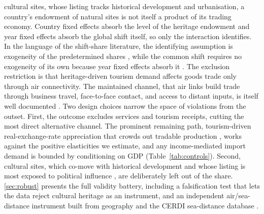 cultural sites, whose listing tracks historical development and urbanisation, a country's endowment of natural sites is not itself a product of its trading economy. Country fixed effects absorb the level of the heritage endowment and year fixed effects absorb the global shift itself, so only the interaction identifies. In the language of the shift-share literature, the identifying assumption is exogeneity of the predetermined shares \citep{GoldsmithPinkham_2020}, while the common shift requires no exogeneity of its own because year fixed effects absorb it \citep{Borusyak_2022}. The exclusion restriction is that heritage-driven tourism demand affects goods trade only through air connectivity. The maintained channel, that air links build trade through business travel, face-to-face contact, and access to distant inputs, is itself well documented \citep{Campante_2017,Feyrer_2019}. Two design choices narrow the space of violations from the outset. First, the outcome excludes services and tourism receipts, cutting the most direct alternative channel. The prominent remaining path, tourism-driven real-exchange-rate appreciation that crowds out tradable production \citep{Copeland_1991,Holzner_2011}, works against the positive elasticities we estimate, and any income-mediated import demand is bounded by conditioning on GDP (Table~\ref{tab:controls}). Second, cultural sites, which co-move with historical development and whose listing is most exposed to political influence \citep{Bertacchini_2016}, are deliberately left out of the share.
\ref{sec:robust} presents the full validity battery, including a falsification test that lets the data reject cultural heritage as an instrument, and an independent air/sea-distance instrument built from geography and the CERDI sea-distance database \citep{Bertoli_2016}.


